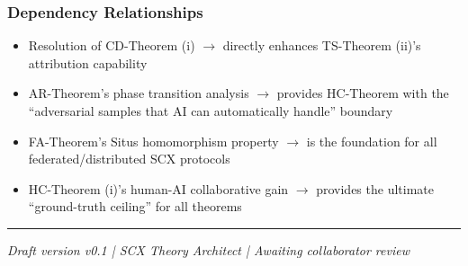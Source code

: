 \documentclass[
  12pt,
]{article}
\providecommand{\tightlist}{%
  \setlength{\itemsep}{0pt}\setlength{\parskip}{0pt}}
\begin{document}
\subsubsection{Dependency Relationships}\label{dependency-relationships}

\begin{itemize}
\tightlist
\item
  Resolution of CD-Theorem (i) $\to$ directly enhances TS-Theorem (ii)'s attribution capability
\item
  AR-Theorem's phase transition analysis $\to$ provides HC-Theorem with the ``adversarial samples that AI can automatically handle'' boundary
\item
  FA-Theorem's Situs homomorphism property $\to$ is the foundation for all federated/distributed SCX protocols
\item
  HC-Theorem (i)'s human-AI collaborative gain $\to$ provides the ultimate ``ground-truth ceiling'' for all theorems
\end{itemize}

\begin{center}\rule{0.5\linewidth}{0.5pt}\end{center}

\emph{Draft version v0.1 | SCX Theory Architect | Awaiting collaborator review}
\end{document}
